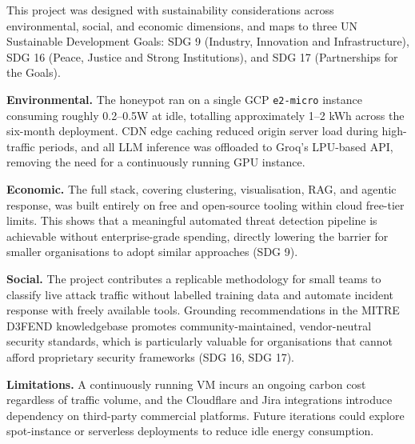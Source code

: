 \documentclass[12pt, a4paper]{report}   %
\begin{document}
This project was designed with sustainability considerations across 
environmental, social, and economic dimensions, and maps to three 
UN Sustainable Development Goals: SDG 9 (Industry, Innovation and 
Infrastructure), SDG 16 (Peace, Justice and Strong Institutions), 
and SDG 17 (Partnerships for the Goals).

\textbf{Environmental.} The honeypot ran on a single GCP 
\texttt{e2-micro} instance consuming roughly 0.2--0.5W at idle, 
totalling approximately 1--2 kWh across the six-month deployment. 
CDN edge caching reduced origin server load during high-traffic 
periods, and all LLM inference was offloaded to Groq's LPU-based 
API, removing the need for a continuously running GPU instance.

\textbf{Economic.} The full stack, covering clustering, visualisation, 
RAG, and agentic response, was built entirely on free and open-source 
tooling within cloud free-tier limits. This shows that a meaningful 
automated threat detection pipeline is achievable without 
enterprise-grade spending, directly lowering the barrier for 
smaller organisations to adopt similar approaches (SDG 9).

\textbf{Social.} The project contributes a replicable methodology 
for small teams to classify live attack traffic without labelled 
training data and automate incident response with freely available 
tools. Grounding recommendations in the MITRE D3FEND knowledgebase 
promotes community-maintained, vendor-neutral security standards, 
which is particularly valuable for organisations that cannot afford 
proprietary security frameworks (SDG 16, SDG 17).

\textbf{Limitations.} A continuously running VM incurs an ongoing 
carbon cost regardless of traffic volume, and the Cloudflare and 
Jira integrations introduce dependency on third-party commercial 
platforms. Future iterations could explore spot-instance or 
serverless deployments to reduce idle energy consumption.
\end{document}

